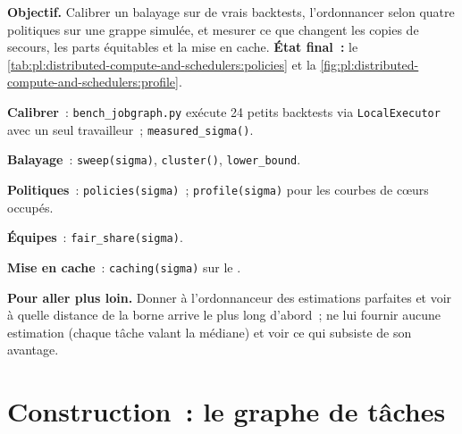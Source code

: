 \begin{tutorial}
\textbf{Objectif.} Calibrer un balayage sur de vrais backtests, l'ordonnancer selon quatre politiques sur une grappe simulée, et mesurer ce que changent les copies de secours,
les parts équitables et la mise en cache. \textbf{État final~:} le \cref{tab:pl:distributed-compute-and-schedulers:policies} et
la \cref{fig:pl:distributed-compute-and-schedulers:profile}.
\begin{tutsteps}
\item \textbf{Calibrer}~: \texttt{bench\_jobgraph.py} exécute 24 petits backtests via \texttt{LocalExecutor} avec un seul travailleur~;
\texttt{measured\_sigma()}.
\item \textbf{Balayage}~: \texttt{sweep(sigma)}, \texttt{cluster()}, \texttt{lower\_bound}.
\item \textbf{Politiques}~: \texttt{policies(sigma)}~; \texttt{profile(sigma)} pour les courbes de cœurs occupés.
\item \textbf{Équipes}~: \texttt{fair\_share(sigma)}.
\item \textbf{Mise en cache}~: \texttt{caching(sigma)} sur le .
\end{tutsteps}
\textbf{Pour aller plus loin.} Donner à l'ordonnanceur des estimations parfaites et voir à quelle distance de la borne arrive le plus long d'abord~; ne lui fournir aucune estimation
(chaque tâche valant la médiane) et voir ce qui subsiste de son avantage.
\end{tutorial}

\section{Construction~: le graphe de tâches}\label{bld:pl:distributed-compute-and-schedulers:jobgraph}

